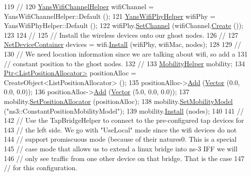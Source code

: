 \begin{DoxyCode}
119   \textcolor{comment}{//}
120   \hyperlink{classns3_1_1YansWifiChannelHelper}{YansWifiChannelHelper} wifiChannel = YansWifiChannelHelper::Default ();
121   \hyperlink{classns3_1_1YansWifiPhyHelper}{YansWifiPhyHelper} wifiPhy = YansWifiPhyHelper::Default ();
122   wifiPhy.\hyperlink{classns3_1_1YansWifiPhyHelper_ad2e9a27587dd4ff320435c93cc2676de}{SetChannel} (wifiChannel.\hyperlink{classns3_1_1YansWifiChannelHelper_a0532e292ab9452f3cf630c848708e563}{Create} ());
123 
124   \textcolor{comment}{//}
125   \textcolor{comment}{// Install the wireless devices onto our ghost nodes.}
126   \textcolor{comment}{//}
127   \hyperlink{classns3_1_1NetDeviceContainer}{NetDeviceContainer} devices = wifi.\hyperlink{classns3_1_1WifiHelper_a451b3d33fa1497c22f06c5451f57a127}{Install} (wifiPhy, wifiMac, nodes);
128 
129   \textcolor{comment}{//}
130   \textcolor{comment}{// We need location information since we are talking about wifi, so add a}
131   \textcolor{comment}{// constant position to the ghost nodes.}
132   \textcolor{comment}{//}
133   \hyperlink{classns3_1_1MobilityHelper}{MobilityHelper} mobility;
134   \hyperlink{classns3_1_1Ptr}{Ptr<ListPositionAllocator>} positionAlloc = CreateObject<ListPositionAllocator> 
      ();
135   positionAlloc->\hyperlink{classns3_1_1ListPositionAllocator_a460e82f015ac012a73ba0ea0cccb3486}{Add} (\hyperlink{classns3_1_1Vector3D_a7e59b47bc94c9cb1dadff68c1d0112d8}{Vector} (0.0, 0.0, 0.0));
136   positionAlloc->\hyperlink{classns3_1_1ListPositionAllocator_a460e82f015ac012a73ba0ea0cccb3486}{Add} (\hyperlink{classns3_1_1Vector3D_a7e59b47bc94c9cb1dadff68c1d0112d8}{Vector} (5.0, 0.0, 0.0));
137   mobility.\hyperlink{classns3_1_1MobilityHelper_ac59d5295076be3cc11021566713a28c5}{SetPositionAllocator} (positionAlloc);
138   mobility.\hyperlink{classns3_1_1MobilityHelper_a030275011b6f40682e70534d30280aba}{SetMobilityModel} (\textcolor{stringliteral}{"ns3::ConstantPositionMobilityModel"});
139   mobility.\hyperlink{classns3_1_1MobilityHelper_a07737960ee95c0777109cf2994dd97ae}{Install} (nodes);
140 
141   \textcolor{comment}{//}
142   \textcolor{comment}{// Use the TapBridgeHelper to connect to the pre-configured tap devices for }
143   \textcolor{comment}{// the left side.  We go with "UseLocal" mode since the wifi devices do not}
144   \textcolor{comment}{// support promiscuous mode (because of their natures0.  This is a special}
145   \textcolor{comment}{// case mode that allows us to extend a linux bridge into ns-3 IFF we will}
146   \textcolor{comment}{// only see traffic from one other device on that bridge.  That is the case}
147   \textcolor{comment}{// for this configuration.}

\end{DoxyCode}
